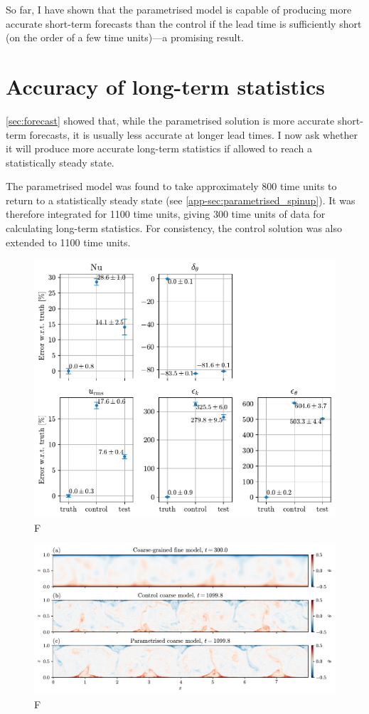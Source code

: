 \documentclass[../main.tex]{subfiles}
\begin{document}
So far, I have shown that the parametrised model is capable of producing
more accurate short-term forecasts than the control if the lead time is
sufficiently short (on the order of a few time units)---a promising result.


\section{Accuracy of long-term statistics} \label{sec:climate}
\cref{sec:forecast} showed that, while the parametrised solution is more
accurate short-term forecasts, it is usually less accurate at longer lead
times. I now ask whether it will produce more accurate long-term statistics
if allowed to reach a statistically steady state.

The parametrised model was found
to take approximately 800 time units to return to a statistically steady state
(see \cref{app-sec:parametrised_spinup}). It was therefore integrated for
1100 time units, giving 300 time units of data for calculating long-term
statistics. For consistency, the control solution was also extended to 1100
time units.

\begin{figure}[ht]
    \centering
    \includegraphics[width=0.65\linewidth]{figures/stats.pdf}
    \caption{
        F
    }
    \label{fig:stats}
\end{figure}

\begin{figure}[ht]
    \centering
    \includegraphics[width=\linewidth]{figures/steady_state_vis.pdf}
    \caption{
        F
    }
    \label{fig:steady_state_vis}
\end{figure}
\end{document}
